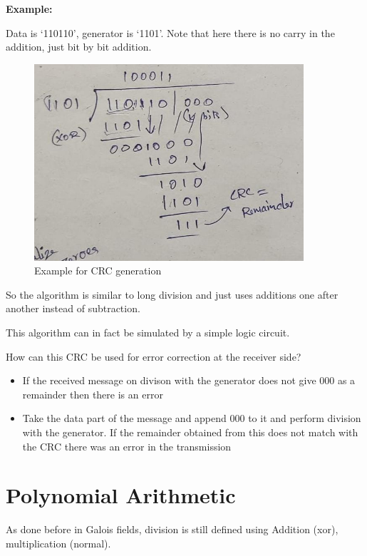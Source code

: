 \documentclass[12pt]{article}
\newcommand{\tbox}[1]{\noindent\fbox{\parbox{\textwidth}{#1}}}
\begin{document}
\textbf{Example:}

Data is `110110', generator is `1101'. 
Note that here there is no carry in the addition, just bit by bit addition. 

\begin{figure}[H]
    \centering
    \includegraphics*[width = 10cm]{Diagrams/galois.jpg}
    \caption{Example for CRC generation}   
\end{figure}

So the algorithm is similar to long division and just uses additions one after another instead of 
subtraction. 

This algorithm can in fact be simulated by a simple logic circuit. 


How can this CRC be used for error correction at the receiver side?
\begin{itemize}
    \item If the received message on divison with the generator does not give 000 as a remainder then there is an error
    \item Take the data part of the message and append 000 to it and perform division with the generator. If the remainder obtained from this does not match with the CRC there was an error in the transmission
\end{itemize}

\noindent\tbox{
    \begin{center}
    \textbf{\Huge Lecture 12}
    \end{center}
}
\section{Polynomial Arithmetic}

As done before in Galois fields, division is still defined using 
Addition (xor), multiplication (normal).
\end{document}
